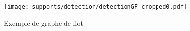 



\begin{figure}[h]
\begin{center}
\texttt{[image: supports/detection/detectionGF\_cropped0.pdf]}
\end{center}
\caption{Exemple de graphe de flot}
\label{fig:am_exemple_gf}
\end{figure}



